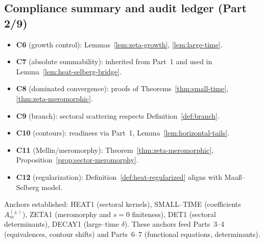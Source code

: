 
\subsection{Compliance summary and audit ledger (Part 2/9)}
\label{subsec:ch6-part2-compliance} \relax \hspace{0pt}
\begin{remark}
\label{rem:part2-compliance}
\begin{itemize}[leftmargin=7mm]
\item \textbf{C6} (growth control): Lemmas~\ref{lem:zeta-growth}, \ref{lem:large-time}.
\item \textbf{C7} (absolute summability): inherited from Part~1 and used in Lemma~\ref{lem:heat-selberg-bridge}.
\item \textbf{C8} (dominated convergence): proofs of Theorems~\ref{thm:small-time}, \ref{thm:zeta-meromorphic}.
\item \textbf{C9} (branch): sectoral scattering respects Definition~\ref{def:branch}.
\item \textbf{C10} (contours): readiness via Part~1, Lemma~\ref{lem:horizontal-tails}.
\item \textbf{C11} (Mellin/meromorphy): Theorem~\ref{thm:zeta-meromorphic}, Proposition~\ref{prop:sector-meromorphy}.
\item \textbf{C12} (regularization): Definition~\ref{def:heat-regularized} aligns with Maaß–Selberg model.
\end{itemize}
\end{remark}

\begin{remark}
\label{rem:part2-ledger}
Anchors established:
\textsf{HEAT1} (sectoral kernels),
\textsf{SMALL–TIME} (coefficients $A_m^{(\pm)}$),
\textsf{ZETA1} (meromorphy and $s=0$ finiteness),
\textsf{DET1} (sectoral determinants),
\textsf{DECAY1} (large–time $\delta$).
These anchors feed Parts~3–4 (equivalences, contour shifts) and Parts~6–7 (functional equations, determinants). 
\end{remark}

